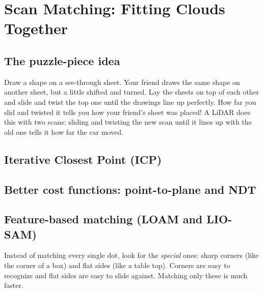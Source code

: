 \chapter{Scan Matching: Fitting Clouds Together}

\section{The puzzle-piece idea}

\begin{kid}
Draw a shape on a see-through sheet. Your friend draws the same shape on another sheet, but a little shifted and turned. Lay the sheets on top of each other and slide and twist the top one until the drawings line up perfectly. How far you slid and twisted it tells you how your friend's sheet was placed! A LiDAR does this with two scans: sliding and twisting the new scan until it lines up with the old one tells it how far the car moved.
\end{kid}

\section{Iterative Closest Point (ICP)}


\section{Better cost functions: point-to-plane and NDT}



\section{Feature-based matching (LOAM and LIO-SAM)}


\begin{kid}
Instead of matching every single dot, look for the \emph{special} ones: sharp corners (like the corner of a box) and flat sides (like a table top). Corners are easy to recognize and flat sides are easy to slide against. Matching only these is much faster.
\end{kid}

